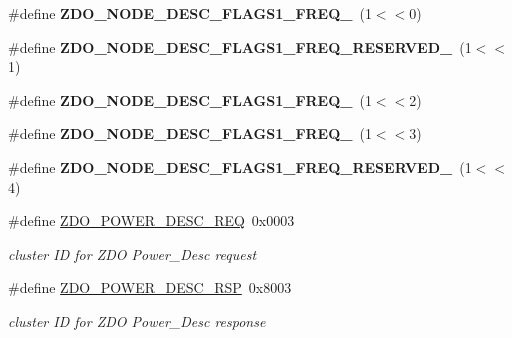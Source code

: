 \begin{DoxyCompactItemize}
\mbox{\label{group__zdo_gabdea6b505cf180a055176641383e3b16}} 
\#define {\bfseries Z\+D\+O\+\_\+\+N\+O\+D\+E\+\_\+\+D\+E\+S\+C\+\_\+\+F\+L\+A\+G\+S1\+\_\+\+F\+R\+E\+Q\+\_}~(1$<$$<$0)
\item 
\mbox{\label{group__zdo_gad8202e575692c98ef71cdba4f242dbe4}} 
\#define {\bfseries Z\+D\+O\+\_\+\+N\+O\+D\+E\+\_\+\+D\+E\+S\+C\+\_\+\+F\+L\+A\+G\+S1\+\_\+\+F\+R\+E\+Q\+\_\+\+R\+E\+S\+E\+R\+V\+E\+D\+\_}~(1$<$$<$1)
\item 
\mbox{\label{group__zdo_ga9341ad451dc0eb833c7b536b0f52f5cf}} 
\#define {\bfseries Z\+D\+O\+\_\+\+N\+O\+D\+E\+\_\+\+D\+E\+S\+C\+\_\+\+F\+L\+A\+G\+S1\+\_\+\+F\+R\+E\+Q\+\_}~(1$<$$<$2)
\item 
\mbox{\label{group__zdo_ga76eff916f936a26c1d1d3bca683b4a5a}} 
\#define {\bfseries Z\+D\+O\+\_\+\+N\+O\+D\+E\+\_\+\+D\+E\+S\+C\+\_\+\+F\+L\+A\+G\+S1\+\_\+\+F\+R\+E\+Q\+\_}~(1$<$$<$3)
\item 
\mbox{\label{group__zdo_ga95ced39975281d36fd6d075c89a0c248}} 
\#define {\bfseries Z\+D\+O\+\_\+\+N\+O\+D\+E\+\_\+\+D\+E\+S\+C\+\_\+\+F\+L\+A\+G\+S1\+\_\+\+F\+R\+E\+Q\+\_\+\+R\+E\+S\+E\+R\+V\+E\+D\+\_}~(1$<$$<$4)
\item 
\mbox{\label{group__zdo_ga6289766f3024daf25e1482536f78e2cc}} 
\#define \hyperlink{group__zdo_ga6289766f3024daf25e1482536f78e2cc}{Z\+D\+O\+\_\+\+P\+O\+W\+E\+R\+\_\+\+D\+E\+S\+C\+\_\+\+R\+EQ}~0x0003
\begin{DoxyCompactList}\small\item\em cluster ID for Z\+DO Power\+\_\+\+Desc request \end{DoxyCompactList}\item 
\mbox{\label{group__zdo_ga346087460c7fc4356d01deb9e955bcd3}} 
\#define \hyperlink{group__zdo_ga346087460c7fc4356d01deb9e955bcd3}{Z\+D\+O\+\_\+\+P\+O\+W\+E\+R\+\_\+\+D\+E\+S\+C\+\_\+\+R\+SP}~0x8003
\begin{DoxyCompactList}\small\item\em cluster ID for Z\+DO Power\+\_\+\+Desc response \end{DoxyCompactList}\item 
\mbox{\label{group__zdo_ga273177b195b871fe08bb7e5cab487141}} 
$$
\end{DoxyCompactItemize}
